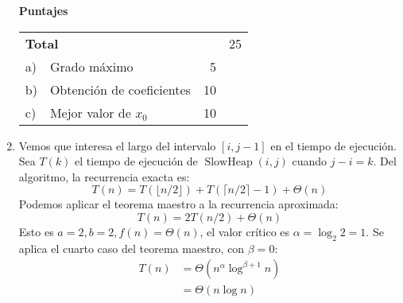 \documentclass[english, spanish, fleqn]{article}
\begin{document}
\begin{enumerate}
  \vspace*{2\baselineskip}
  \begin{minipage}{1.0\linewidth}
    {\Large\textbf{Puntajes}}\\[0.5\baselineskip]
    \begin{tabular}{l@{\;}lrr}
      \multicolumn{2}{l}{\textbf{Total}}	       &    & 25 \\
      a) & Grado máximo                                &  5 &    \\
      b) & Obtención de coeficientes                   & 10 &    \\
      c) & Mejor valor de \(x_0\)                      & 10 &
    \end{tabular}
  \end{minipage}
\pagebreak[4]
  \item %
    Vemos que interesa el largo del intervalo \([i, j - 1]\)
    en el tiempo de ejecución.
    Sea \(T(k)\) el tiempo de ejecución de \(\operatorname{SlowHeap}(i, j)\)
    cuando \(j - i = k\).
    Del algoritmo,
    la recurrencia exacta es:
    \begin{equation*}
      T(n)
	= T(\lfloor n / 2 \rfloor)
	   + T(\lceil n / 2 \rceil - 1) + \Theta(n)
    \end{equation*}
    Podemos aplicar el teorema maestro a la recurrencia aproximada:
    \begin{equation*}
      T(n)
	= 2 T(n/2) + \Theta(n)
    \end{equation*}
    Esto es \(a = 2, b = 2, f(n) = \Theta(n)\),
    el valor crítico es \(\alpha = \log_2 2 = 1\).
    Se aplica el cuarto caso del teorema maestro,
    con \(\beta = 0\):
    \begin{align*}
      T(n)
	&= \Theta(n^\alpha \log^{\beta + 1} n) \\
	&= \Theta(n \log n)
    \end{align*}


\end{enumerate}
\end{document}
